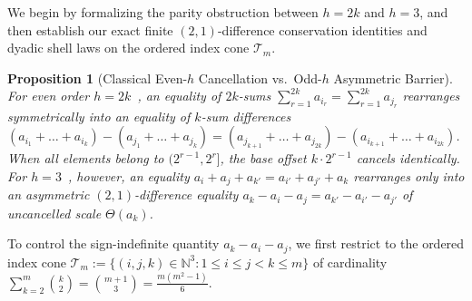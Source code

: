 \documentclass[11pt,a4paper]{article}
\newtheorem{proposition}[theorem]{Proposition}
\theoremstyle{remark}
\begin{document}
We begin by formalizing the parity obstruction between $h = 2k$ and $h = 3$, and then establish our exact finite $(2,1)$-difference conservation identities and dyadic shell laws on the ordered index cone $\mathcal{T}_m$.

\begin{proposition}[Classical Even-$h$ Cancellation vs.\ Odd-$h$ Asymmetric Barrier]
For even order $h = 2k$~\cite{Stohr1955,Nash1989,Jia1993}, an equality of $2k$-sums $\sum_{r=1}^{2k} a_{i_r} = \sum_{r=1}^{2k} a_{j_r}$ rearranges symmetrically into an equality of $k$-sum differences $(a_{i_1} + \dots + a_{i_k}) - (a_{j_1} + \dots + a_{j_k}) = (a_{j_{k+1}} + \dots + a_{j_{2k}}) - (a_{i_{k+1}} + \dots + a_{i_{2k}})$. When all elements belong to $(2^{r-1}, 2^r]$, the base offset $k\cdot 2^{r-1}$ cancels identically. For $h = 3$~\cite{Nash1995}, however, an equality $a_i + a_j + a_{k'} = a_{i'} + a_{j'} + a_k$ rearranges only into an asymmetric $(2,1)$-difference equality $a_k - a_i - a_j = a_{k'} - a_{i'} - a_{j'}$ of uncancelled scale $\Theta(a_k)$.
\end{proposition}

To control the sign-indefinite quantity $a_k - a_i - a_j$, we first restrict to the ordered index cone $\mathcal{T}_m := \{(i, j, k) \in \mathbb{N}^3 : 1 \le i \le j < k \le m\}$ of cardinality $\sum_{k=2}^m \binom{k}{2} = \binom{m + 1}{3} = \frac{m(m^2 - 1)}{6}$.
\end{document}
